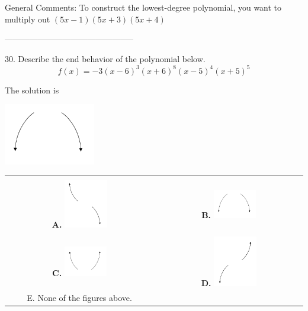 \documentclass{extbook}[14pt]
\begin{document}
General Comments: To construct the lowest-degree polynomial, you want to multiply out $(5x -1)(5x + 3)(5x + 4)$

-----------------------------------------------

30. Describe the end behavior of the polynomial below.
\[ f(x) = -3(x - 6)^{3}(x + 6)^{8}(x - 5)^{4}(x + 5)^{5} \] 

 
 The solution is  
 \begin{center} \includegraphics[width=0.3\textwidth]{../Figures/polyEndBehaviorBC.png} \end{center}\begin{tabular}{|c|c|} 
\hline 
 & \tabularnewline 
 \textbf{A.} \includegraphics[width=0.3\textwidth]{../Figures/polyEndBehaviorAC.png} & \textbf{B.} \includegraphics[width=0.3\textwidth]{../Figures/polyEndBehaviorBC.png} \tabularnewline 
\hline 
 & \tabularnewline 
 \textbf{C.} \includegraphics[width=0.3\textwidth]{../Figures/polyEndBehaviorCC.png} & \textbf{D.} \includegraphics[width=0.3\textwidth]{../Figures/polyEndBehaviorDC.png} \tabularnewline 
\hline 
 E. None of the figures above. & \tabularnewline 
\hline 
 \end{tabular} 
 
\end{document}

